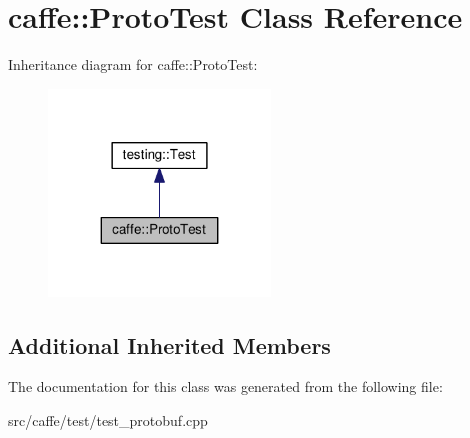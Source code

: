 \hypertarget{classcaffe_1_1_proto_test}{}\section{caffe\+:\+:Proto\+Test Class Reference}
\label{classcaffe_1_1_proto_test}


Inheritance diagram for caffe\+:\+:Proto\+Test\+:
\nopagebreak
\begin{figure}[H]
\begin{center}
\leavevmode
\includegraphics[width=167pt]{classcaffe_1_1_proto_test__inherit__graph}
\end{center}
\end{figure}
\subsection*{Additional Inherited Members}


The documentation for this class was generated from the following file\+:\begin{DoxyCompactItemize}
\item 
src/caffe/test/test\+\_\+protobuf.\+cpp\end{DoxyCompactItemize}
